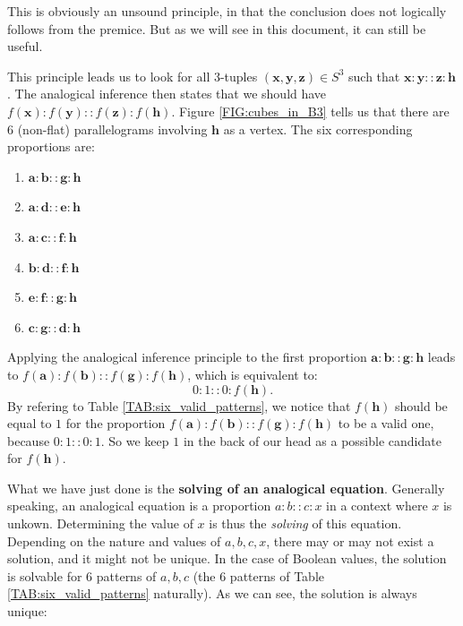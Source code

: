 This is obviously an unsound principle, in that the conclusion does not
logically follows from the premice. But as we will see in this document, it can
still be useful.

This principle leads us to look for all 3-tuples $(\mathbf{x}, \mathbf{y},
\mathbf{z}) \in S^3$ such that $\mathbf{x}:\mathbf{y}::\mathbf{z}:\mathbf{h}$.
The analogical inference then states that we should have
$f(\mathbf{x}):f(\mathbf{y})::f(\mathbf{z}):f(\mathbf{h})$. Figure
\ref{FIG:cubes_in_B3} tells us that there are 6 (non-flat) parallelograms
involving $\mathbf{h}$ as a vertex. The six corresponding proportions are:

\begin{enumerate}
  \item $\mathbf{a} : \mathbf{b} :: \mathbf{g} : \mathbf{h}$
  \item $\mathbf{a} : \mathbf{d} :: \mathbf{e} : \mathbf{h}$
  \item $\mathbf{a} : \mathbf{c} :: \mathbf{f} : \mathbf{h}$
  \item $\mathbf{b} : \mathbf{d} :: \mathbf{f} : \mathbf{h}$
  \item $\mathbf{e} : \mathbf{f} :: \mathbf{g} : \mathbf{h}$
  \item $\mathbf{c} : \mathbf{g} :: \mathbf{d} : \mathbf{h}$
\end{enumerate}

Applying the analogical inference principle to the first proportion $\mathbf{a}
: \mathbf{b} :: \mathbf{g} : \mathbf{h}$ leads to $f(\mathbf{a}) :
f(\mathbf{b}) :: f(\mathbf{g}) : f(\mathbf{h})$, which is equivalent to:
$$0:1::0:f(\mathbf{h}).$$ By refering to Table \ref{TAB:six_valid_patterns}, we
notice that $f(\mathbf{h})$ should be equal to $1$ for the proportion
$f(\mathbf{a}) : f(\mathbf{b}) :: f(\mathbf{g}) : f(\mathbf{h})$ to be a valid
one, because $0:1::0:1$. So we keep $1$ in the back of our head as a possible
candidate for $f(\mathbf{h})$.

What we have just done is the \textbf{solving of an analogical equation}.
Generally speaking, an analogical equation is a proportion $a:b::c:x$ in a
context where $x$ is unkown. Determining the value of $x$ is thus the
\textit{solving} of this equation. Depending on the nature and values of $a, b,
c, x$, there may or may not exist a solution, and it might not be unique. In
the case of Boolean values, the solution is solvable for 6 patterns of $a, b,
c$ (the 6 patterns of Table \ref{TAB:six_valid_patterns} naturally). As we can
see, the solution is always unique:


